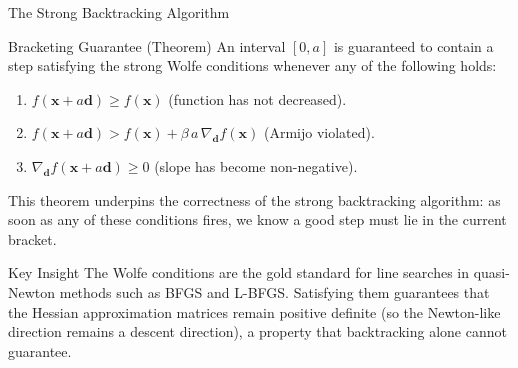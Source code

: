 \documentclass[aspectratio=169,10pt]{beamer}
\newcommand{\bx}{\mathbf{x}}
\newcommand{\bd}{\mathbf{d}}
\begin{document}
\begin{frame}[allowframebreaks]{The Strong Backtracking Algorithm}
  \framebreak

  \begin{block}{Bracketing Guarantee (Theorem)}
    An interval $[0, a]$ is guaranteed to contain a step satisfying
    the strong Wolfe conditions whenever any of the following holds:
    \begin{enumerate}
      \item $f(\bx+a\bd) \ge f(\bx)$ \quad (function has not decreased).
      \item $f(\bx+a\bd) > f(\bx) + \beta\,a\,\nabla_{\bd}f(\bx)$
            \quad (Armijo violated).
      \item $\nabla_{\bd}f(\bx+a\bd) \ge 0$
            \quad (slope has become non-negative).
    \end{enumerate}
    This theorem underpins the correctness of the strong backtracking
    algorithm: as soon as any of these conditions fires, we know a
    good step must lie in the current bracket.
  \end{block}

  \begin{alertblock}{Key Insight}
    The Wolfe conditions are the gold standard for line searches in
    quasi-Newton methods such as BFGS and L-BFGS.  Satisfying them
    guarantees that the Hessian approximation matrices remain positive
    definite (so the Newton-like direction remains a descent direction),
    a property that backtracking alone cannot guarantee.
  \end{alertblock}

\end{frame}
\end{document}
